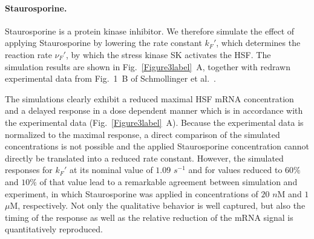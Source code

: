 \documentclass[oneside, 10pt, a4paper, twocolumn]{article}
\begin{document}



\paragraph{Staurosporine.}

Staurosporine is a protein kinase inhibitor.
We therefore simulate the effect of applying Staurosporine by lowering the rate constant $k_F'$, 
which determines the reaction rate $\nu_F'$, by which the stress kinase SK activates the HSF. 
The simulation results are shown in Fig.~\ref{Figure3label}~A, together with redrawn 
experimental data from Fig.~1~B of Schmollinger et al.~\cite{Schmollinger2013}.

The simulations clearly exhibit a reduced maximal HSF mRNA concentration and a delayed response in a dose dependent manner which is in accordance with the experimental data (Fig.~\ref{Figure3label}~A). 
Because the experimental data is normalized 
to the maximal response, a direct comparison of the simulated
concentrations is not possible and the applied Staurosporine
concentration cannot directly be translated into a reduced rate
constant.
However, the simulated responses for $k_F'$ at its nominal value of $1.09$ $s^{-1}$ and for values reduced to $60 \%$ and $10 \%$ of that value lead to a remarkable agreement
between simulation and experiment, in which Staurosporine was applied 
in concentrations of $20$ $n$M and $1$ $\mu$M, respectively.
Not only the qualitative behavior is well captured, but also the
timing of the response as well as the relative reduction of the mRNA signal
is quantitatively reproduced.

\end{document}
